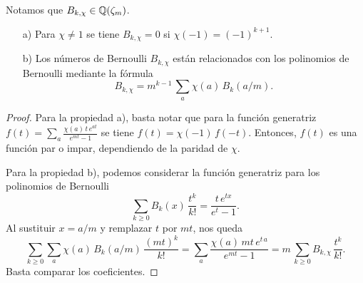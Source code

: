 Notamos que $B_{k,\chi} \in \mathbb{Q} (\zeta_m)$.

\begin{proposicion}
  \label{prop:propiedades-de-numeros-de-Bernoulli-generalizados}
  \begin{enumerate}
  \item[a)] Para $\chi \ne 1$ se tiene $B_{k,\chi} = 0$ si
    $\chi (-1) = (-1)^{k+1}$.

  \item[b)] Los números de Bernoulli $B_{k,\chi}$ están relacionados con los
    polinomios de Bernoulli mediante la fórmula
    $$B_{k,\chi} = m^{k-1} \, \sum_a \chi (a)\,B_k (a/m).$$
  \end{enumerate}

  \begin{proof}
    Para la propiedad a), basta notar que para la función generatriz
    $f (t) = \sum_a \frac{\chi (a)\,t\,e^{at}}{e^{mt}-1}$
    se tiene $f (t) = \chi (-1) \, f (-t)$. Entonces, $f (t)$ es una función par
    o impar, dependiendo de la paridad de $\chi$.

    Para la propiedad b), podemos considerar la función generatriz para los
    polinomios de Bernoulli
    $$\sum_{k \ge 0} B_k (x) \, \frac{t^k}{k!} = \frac{t\,e^{tx}}{e^t - 1}.$$
    Al sustituir $x = a/m$ y remplazar $t$ por $mt$, nos queda
    \[ \sum_{k \ge 0} \sum_a \chi (a)\,B_k (a/m) \, \frac{(mt)^k}{k!} =
       \sum_a \frac{\chi(a)\,mt\,e^{t\,a}}{e^{mt}-1} =
       m\,\sum_{k\ge 0} B_{k,\chi}\,\frac{t^k}{k!}. \]
    Basta comparar los coeficientes.
  \end{proof}
\end{proposicion}

